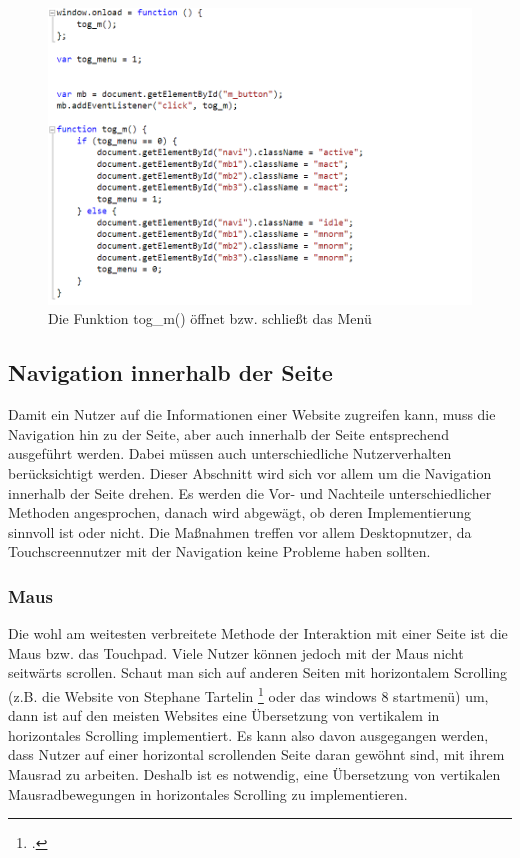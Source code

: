 \begin{figure} [h]
\includegraphics[width=\textwidth]{./img/js_menuevent.png}
\caption{Die Funktion tog\_m() öffnet bzw. schließt das Menü}
\label{js_menuevent}
\end{figure}

\subsection{Navigation innerhalb der Seite}
Damit ein Nutzer auf die Informationen einer Website zugreifen kann, muss die Navigation hin zu der Seite, aber auch innerhalb der Seite entsprechend ausgeführt werden. Dabei müssen auch unterschiedliche Nutzerverhalten berücksichtigt werden. Dieser Abschnitt wird sich vor allem um die Navigation innerhalb der Seite drehen. Es werden die Vor- und Nachteile unterschiedlicher Methoden angesprochen, danach wird abgewägt, ob deren Implementierung sinnvoll ist oder nicht.
Die Maßnahmen treffen vor allem Desktopnutzer, da Touchscreennutzer mit der Navigation keine Probleme haben sollten.
\subsubsection{Maus}
Die wohl am weitesten verbreitete Methode der Interaktion mit einer Seite ist die Maus bzw. das Touchpad. Viele Nutzer können jedoch mit der Maus nicht seitwärts scrollen. Schaut man sich auf anderen Seiten mit horizontalem Scrolling (z.B. die Website von Stephane Tartelin
\footcite[zu finden auf:][]{tartelin} oder das windows 8 startmenü) um, dann ist auf den meisten Websites eine Übersetzung von vertikalem in horizontales Scrolling implementiert. Es kann also davon ausgegangen werden, dass Nutzer auf einer horizontal scrollenden Seite daran gewöhnt sind, mit ihrem Mausrad zu arbeiten. Deshalb ist es notwendig, eine Übersetzung von vertikalen Mausradbewegungen in horizontales Scrolling zu implementieren. 
	
